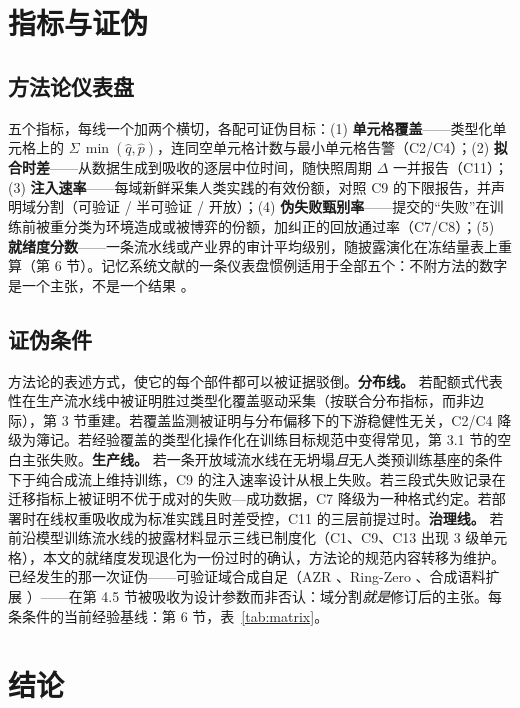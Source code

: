 \documentclass[10pt,fontset=fandol]{ctexart}
\begin{document}
\section{指标与证伪}

\subsection{方法论仪表盘}

五个指标，每线一个加两个横切，各配可证伪目标：(1) \textbf{单元格覆盖}——类型化单元格上的 $\Sigma\,\min(\hat{q},\hat{p})$，连同空单元格计数与最小单元格告警（C2/C4）；(2) \textbf{拟合时差}——从数据生成到吸收的逐层中位时间，随快照周期 $\Delta$ 一并报告（C11）；(3) \textbf{注入速率}——每域新鲜采集人类实践的有效份额，对照 C9 的下限报告，并声明域分割（可验证 / 半可验证 / 开放）；(4) \textbf{伪失败甄别率}——提交的“失败”在训练前被重分类为环境造成或被博弈的份额，加纠正的回放通过率（C7/C8）；(5) \textbf{就绪度分数}——一条流水线或产业界的审计平均级别，随披露演化在冻结量表上重算（第 6 节）。记忆系统文献的一条仪表盘惯例适用于全部五个：不附方法的数字是一个主张，不是一个结果 \cite{ref50}。

\subsection{证伪条件}

方法论的表述方式，使它的每个部件都可以被证据驳倒。\textbf{分布线。} 若配额式代表性在生产流水线中被证明胜过类型化覆盖驱动采集（按联合分布指标，而非边际），第 3 节重建。若覆盖监测被证明与分布偏移下的下游稳健性无关，C2/C4 降级为簿记。若经验覆盖的类型化操作化在训练目标规范中变得常见，第 3.1 节的空白主张失败。\textbf{生产线。} 若一条开放域流水线在无坍塌\emph{且}无人类预训练基座的条件下于纯合成流上维持训练，C9 的注入速率设计从根上失败。若三段式失败记录在迁移指标上被证明不优于成对的失败—成功数据，C7 降级为一种格式约定。若部署时在线权重吸收成为标准实践且时差受控，C11 的三层前提过时。\textbf{治理线。} 若前沿模型训练流水线的披露材料显示三线已制度化（C1、C9、C13 出现 3 级单元格），本文的就绪度发现退化为一份过时的确认，方法论的规范内容转移为维护。已经发生的那一次证伪——可验证域合成自足（AZR \cite{ref37}、Ring-Zero \cite{ref38}、合成语料扩展 \cite{ref36}）——在第 4.5 节被吸收为设计参数而非否认：域分割\emph{就是}修订后的主张。每条条件的当前经验基线：第 6 节，表~\ref{tab:matrix}。

\section{结论}
\end{document}
